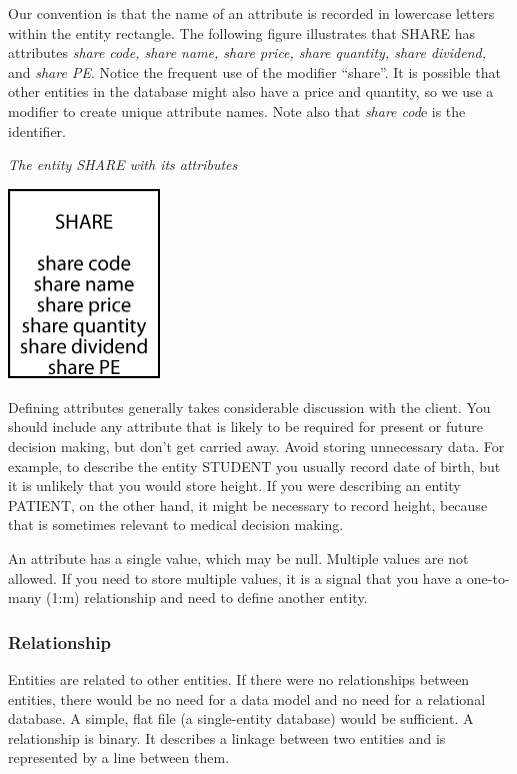 \documentclass[
]{article}
\begin{document}
Our convention is that the name of an attribute is recorded in lowercase
letters within the entity rectangle. The following figure illustrates
that SHARE has attributes \emph{share code, share name, share price, share
quantity, share dividend,} and \emph{share PE}. Notice the frequent use of
the modifier ``share''. It is possible that other entities in the database
might also have a price and quantity, so we use a modifier to create
unique attribute names. Note also that \emph{share cod}e is the identifier.

\emph{The entity SHARE with its attributes}

\includegraphics[width=1.58333in,height=\textheight]{Figures/Chapter 3/share with attributes.png}

Defining attributes generally takes considerable discussion with the
client. You should include any attribute that is likely to be required
for present or future decision making, but don't get carried away. Avoid
storing unnecessary data. For example, to describe the entity STUDENT
you usually record date of birth, but it is unlikely that you would
store height. If you were describing an entity PATIENT, on the other
hand, it might be necessary to record height, because that is sometimes
relevant to medical decision making.

An attribute has a single value, which may be null. Multiple values are
not allowed. If you need to store multiple values, it is a signal that
you have a one-to-many (1:m) relationship and need to define another
entity.

\hypertarget{relationship}{%
\subsubsection*{Relationship}\label{relationship}}

Entities are related to other entities. If there were no relationships
between entities, there would be no need for a data model and no need
for a relational database. A simple, flat file (a single-entity
database) would be sufficient. A relationship is binary. It describes a
linkage between two entities and is represented by a line between them.
\end{document}
